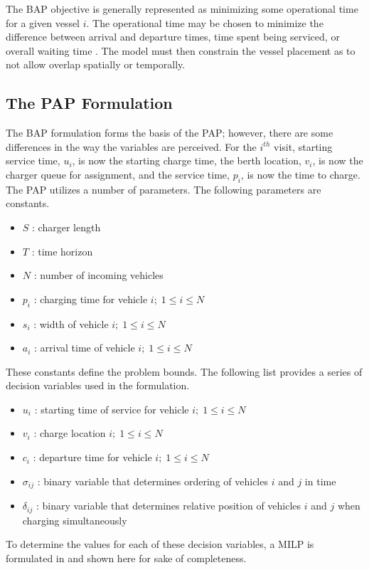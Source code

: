 \documentclass[utf8]{FrontiersinHarvard}
\begin{document}
The BAP objective is generally represented as minimizing some operational time for a given vessel $i$. The operational
time may be chosen to minimize the difference between arrival and departure times, time spent being serviced, or overall
waiting time \citep{Voss2007, Buhrkal2010,Frojan2015}. The model must then constrain the vessel placement as to not allow
overlap spatially or temporally.

\subsection{The PAP Formulation}
The BAP formulation forms the basis of the PAP; however, there are some differences in the way the variables are
perceived. For the $i^{th}$ visit, starting service time, $u_i$, is now the starting charge time, the berth location,
$v_i$, is now the charger queue for assignment, and the service time, $p_i$, is now the time to charge. The PAP utilizes a number of parameters. The following parameters are constants.
\begin{itemize}
	\item $S$   : charger length
	\item $T$   : time horizon
	\item $N$   : number of incoming vehicles
	\item $p_i$ : charging time for vehicle $i;\; 1 \leq i \leq N$
	\item $s_i$ : width of vehicle $i;\; 1 \leq i \leq N$
	\item $a_i$ : arrival time of vehicle $i;\; 1 \leq i \leq N$
\end{itemize}
These constants define the problem bounds. The following list provides a series of decision variables used in the formulation.
\begin{itemize}
    \item $u_i$         : starting time of service for vehicle $i;\; 1 \leq i \leq N$
    \item $v_i$         : charge location $i;\; 1 \leq i \leq N$
    \item $c_i$         : departure time for vehicle $i;\; 1 \leq i \leq N$
    \item $\sigma_{ij}$ : binary variable that determines ordering of vehicles $i$ and $j$ in time
    \item $\delta_{ij}$ : binary variable that determines relative position of vehicles $i$ and $j$ when charging simultaneously
\end{itemize}
To determine the values for each of these decision variables, a MILP is formulated in \citep{Qarebagh2019} and shown here for sake of completeness.
\end{document}
